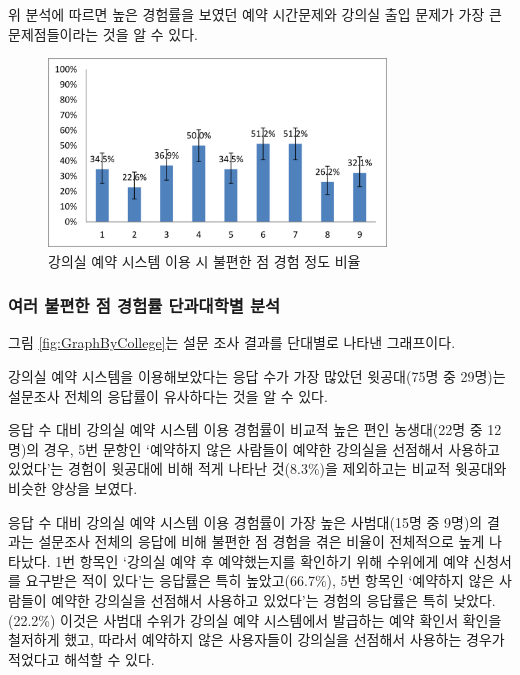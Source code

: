 \documentclass[11pt,a4paper]{article}
\begin{document}
위 분석에 따르면 높은 경험률을 보였던 예약 시간문제와 강의실 출입 문제가 가장 큰 문제점들이라는 것을 알 수 있다.
\begin{figure}[h]
\includegraphics[width=0.8\textwidth]{4_1_2}
\centering
\caption{강의실 예약 시스템 이용 시 불편한 점 경험 정도 비율}
\end{figure}

\subsubsection{여러 불편한 점 경험률 단과대학별 분석}
그림 \ref{fig:GraphByCollege}는 설문 조사 결과를 단대별로 나타낸 그래프이다.

강의실 예약 시스템을 이용해보았다는 응답 수가 가장 많았던 윗공대(75명 중
29명)는 설문조사 전체의 응답률이 유사하다는 것을 알 수 있다.

응답 수 대비 강의실 예약 시스템 이용 경험률이 비교적 높은 편인 농생대(22명 중
12명)의 경우, 5번 문항인 `예약하지 않은 사람들이 예약한 강의실을 선점해서
사용하고 있었다'는 경험이 윗공대에 비해 적게 나타난 것(8.3\%)을 제외하고는
비교적 윗공대와 비슷한
양상을 보였다.

응답 수 대비 강의실 예약 시스템 이용 경험률이 가장 높은 사범대(15명 중 9명)의
결과는 설문조사 전체의 응답에 비해 불편한 점 경험을 겪은 비율이 전체적으로 높게
나타났다. 1번 항목인 `강의실 예약 후 예약했는지를 확인하기 위해 수위에게 예약
신청서를 요구받은 적이 있다'는 응답률은 특히 높았고(66.7\%), 5번 항목인
`예약하지 않은 사람들이 예약한 강의실을 선점해서 사용하고 있었다'는 경험의
응답률은 특히 낮았다. (22.2\%) 이것은 사범대 수위가 강의실 예약 시스템에서
발급하는 예약 확인서 확인을 철저하게 했고, 따라서 예약하지 않은 사용자들이
강의실을 선점해서 사용하는 경우가 적었다고 해석할 수 있다.
\end{document}
